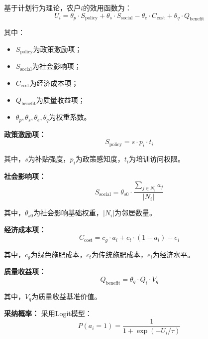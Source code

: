 \documentclass[12pt,a4paper]{article}
\numberwithin{equation}{section}
\begin{document}
基于计划行为理论，农户$i$的效用函数为：
\begin{equation}
U_i = \theta_p \cdot S_{\text{policy}} + \theta_s \cdot S_{\text{social}} - \theta_e \cdot C_{\text{cost}} + \theta_q \cdot Q_{\text{benefit}}
\label{eq:utility_function}
\end{equation}

其中：
\begin{itemize}
    \item $S_{\text{policy}}$为政策激励项；
    \item $S_{\text{social}}$为社会影响项；
    \item $C_{\text{cost}}$为经济成本项；
    \item $Q_{\text{benefit}}$为质量收益项；
    \item $\theta_p, \theta_s, \theta_e, \theta_q$为权重系数。
\end{itemize}

\textbf{政策激励项：}
\begin{equation}
S_{\text{policy}} = s \cdot p_i \cdot t_i
\label{eq:policy_incentive}
\end{equation}

其中，$s$为补贴强度，$p_i$为政策感知度，$t_i$为培训访问权限。

\textbf{社会影响项：}
\begin{equation}
S_{\text{social}} = \theta_{s0} \cdot \frac{\sum_{j \in N_i} a_j}{|N_i|}
\label{eq:social_influence}
\end{equation}

其中，$\theta_{s0}$为社会影响基础权重，$|N_i|$为邻居数量。

\textbf{经济成本项：}
\begin{equation}
C_{\text{cost}} = c_g \cdot a_i + c_t \cdot (1-a_i) - e_i
\label{eq:economic_cost}
\end{equation}

其中，$c_g$为绿色施肥成本，$c_t$为传统施肥成本，$e_i$为经济水平。

\textbf{质量收益项：}
\begin{equation}
Q_{\text{benefit}} = \theta_q \cdot Q_i \cdot V_q
\label{eq:quality_benefit}
\end{equation}

其中，$V_q$为质量收益基准价值。

\textbf{采纳概率：}
采用Logit模型：
\begin{equation}
P(a_i = 1) = \frac{1}{1 + \exp(-U_i / \tau)}
\label{eq:adoption_probability}
\end{equation}
\end{document}
